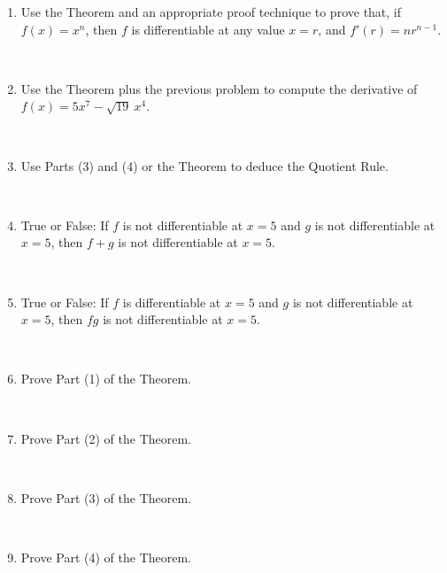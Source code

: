 \documentclass[12pt]{amsart}
\begin{document}
\begin{enumerate}
\item Use the Theorem and an appropriate proof technique to prove that, if $f(x)=x^n$, then $f$ is differentiable at any value $x=r$, and $f'(r)=n r^{n-1}$.

\

 \item Use the Theorem plus the previous problem to compute the derivative of $f(x) = 5x^7 - \sqrt{19} \ x^4$.
 
 \
 
 \item Use Parts (3) and (4) or the Theorem to deduce the Quotient Rule.
 
 \
 
 \item True or False: If $f$ is not differentiable at $x=5$ and $g$ is not differentiable at $x=5$, then $f+g$ is not differentiable at $x=5$.
 
 \
 
  \item True or False: If $f$ is differentiable at $x=5$ and $g$ is not differentiable at $x=5$, then $fg$ is not differentiable at $x=5$.
 
 \
 
 \item Prove Part (1) of the Theorem.
 
 \
 
 \item Prove Part (2) of the Theorem.
 
 \


 \item Prove Part (3) of the Theorem.
 
 \

 \item Prove Part (4) of the Theorem.
 


\end{enumerate}
\end{document}
